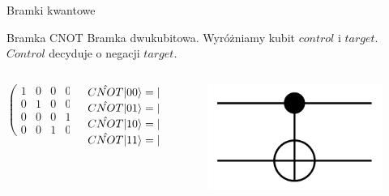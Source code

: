 \documentclass{beamer}
\DeclarePairedDelimiter\ket{\lvert}{\rangle}
\begin{document}
	\begin{frame}{Bramki kwantowe}
		\begin{block}{Bramka CNOT}
			\vspace{0.5em}
			Bramka dwukubitowa. Wyróżniamy kubit $control$ i $target$.\\
			$Control$ decyduje o negacji $target$. 
			\begin{columns}
				\begin{column}{0.35\textwidth}
					\begin{center}
						$\begin{pmatrix}
							1 & 0 & 0 & 0\\
							0 & 1 & 0 & 0\\ 
							0 & 0 & 0 & 1\\
							0 & 0 & 1 & 0
						\end{pmatrix}$
					\end{center}	
				\end{column}
				
				\begin{column}{0.35\textwidth}
					\begin{flushleft}
						$\hat{CNOT}\ket{00} = \ket{00}$\\
						$\hat{CNOT}\ket{01} = \ket{01}$\\
						$\hat{CNOT}\ket{10} = \ket{11}$\\
						$\hat{CNOT}\ket{11} = \ket{10}$
					\end{flushleft}	
				\end{column}
			
				\begin{column}{0.3\textwidth}
					\begin{flushright}
						\begin{figure}
						\includegraphics[scale=0.2,left]{media/cnotGate.png}
						\end{figure}		
					\end{flushright}	
				\end{column}
			\end{columns}
			\vspace{0.5em}
		\end{block}
	\end{frame}
	
\end{document}
